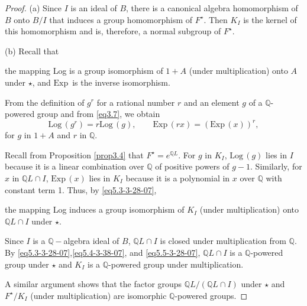 \documentclass[mathscr]{amsart}
\theoremstyle{theorem}
\theoremstyle{definition}
\numberwithin{equation}{section}
\def \({\left(}
\def \){\right)}
\def \Exp{\text{Exp}\,}
\def \Log{\text{Log}\,}
\begin{document}
\begin{proof}
(a) Since $I$ is an ideal of $B$, there is a canonical algebra
homomorphism of $B$ onto $B/I$ that induces a group homomorphism of
$F^\star$.  Then $K_I$ is the kernel of this homomorphism and is,
therefore, a normal subgroup of $F^\star$.

(b) Recall that

\bigskip
\qquad the mapping Log is a group isomorphism of $1+A$ (under
multiplication) onto $A$ under $\star$, and $\Exp$ is the inverse
isomorphism. \vspace{-1.02cm}
\begin{equation}\label{eq5.3-3-28-07}
\end{equation}
\smallskip



From the definition of $g^r$ for a rational number $r$ and an
element $g$ of a $\mathbb{Q}$-powered group and from \eqref{eq3.7},
we obtain
\begin{equation}
\Log\(g^r\)=r\Log(g),\qquad
\Exp\(rx\)=\(\Exp(x)\)^r,\label{eq5.4-3-38-07}
\end{equation}
for $g$ in $1+A$ and $r$ in $\mathbb{Q}$.

Recall from Proposition \ref{prop3.4} that $F^\star=e^{\mathbb{Q}
L}$.  For $g$ in $K_I$, $\Log(g)$ lies in $I$ because it is a linear
combination over $\mathbb{Q}$ of positive powers of $g-1$.
Similarly, for $x$ in $\mathbb{Q}L\cap I$, $\Exp(x)$ lies in $K_I$
because it is a polynomial in $x$ over $\mathbb{Q}$ with constant
term 1.  Thus, by \eqref{eq5.3-3-28-07},

\bigskip
\qquad the mapping Log induces a group isomorphism of $K_I$ (under
multiplication) onto $\mathbb{Q}L\cap I$ under $\star$.
\vspace{-1.02cm}
\begin{equation}\label{eq5.5-3-28-07}
\end{equation}
\smallskip



Since $I$ is a $\mathbb{Q}-$algebra ideal of $B$, $\mathbb{Q}L\cap
I$ is closed under multiplication from $\mathbb{Q}$.  By
\eqref{eq5.3-3-28-07},\eqref{eq5.4-3-38-07}, and
\eqref{eq5.5-3-28-07}, $\mathbb{Q}L\cap I$ is a $\mathbb{Q}$-powered
group under $\star$ and $K_I$ is a $\mathbb{Q}$-powered group under
multiplication.

A similar argument shows that the factor groups
$\mathbb{Q}L/\(\mathbb{Q}L\cap I\)$ under $\star$ and $F^\star/K_I$
(under multiplication) are isomorphic $\mathbb{Q}$-powered groups.
\end{proof}
\end{document}

